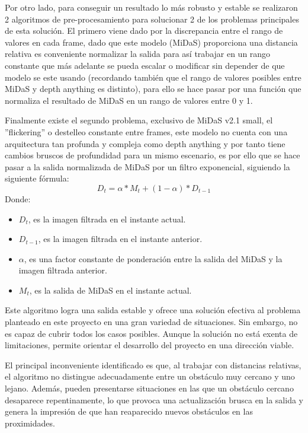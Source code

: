 \newpage

Por otro lado, para conseguir un resultado lo más robusto y estable se realizaron 2 algoritmos de pre-procesamiento para solucionar 2 de los problemas principales de esta solución. El primero viene dado por la discrepancia entre el rango de valores en cada frame, dado que este modelo (MiDaS) proporciona una distancia relativa es conveniente normalizar la salida para así trabajar en un rango constante que más adelante se pueda escalar o modificar sin depender de que modelo se este usando (recordando también que el rango de valores posibles entre MiDaS y depth anything es distinto), para ello se hace pasar por una función que normaliza el resultado de MiDaS en un rango de valores entre 0 y 1.

Finalmente existe el segundo problema, exclusivo de MiDaS v2.1 small, el ''flickering'' o destelleo constante entre frames, este modelo no cuenta con una arquitectura tan profunda y compleja como depth anything y por tanto tiene cambios bruscos de profundidad para un mismo escenario, es por ello que se hace pasar a la salida normalizada de MiDaS por un filtro exponencial, siguiendo la siguiente fórmula:
$$D_{t} = \alpha * M_{t} + (1 - \alpha) * D_{t-1}$$
\newpage
Donde:
\begin{itemize}
    \item $D_{t}$, es la imagen filtrada en el instante actual.
    \item $D_{t-1}$, es la imagen filtrada en el instante anterior.
    \item $\alpha$, es una factor constante de ponderación entre la salida del MiDaS y la imagen filtrada anterior.
    \item $M_{t}$, es la salida de MiDaS en el instante actual.
\end{itemize}

Este algoritmo logra una salida estable y ofrece una solución efectiva al problema planteado en este proyecto en una gran variedad de situaciones. Sin embargo, no es capaz de cubrir todos los casos posibles. Aunque la solución no está exenta de limitaciones, permite orientar el desarrollo del proyecto en una dirección viable.

El principal inconveniente identificado es que, al trabajar con distancias relativas, el algoritmo no distingue adecuadamente entre un obstáculo muy cercano y uno lejano. Además, pueden presentarse situaciones en las que un obstáculo cercano desaparece repentinamente, lo que provoca una actualización brusca en la salida y genera la impresión de que han reaparecido nuevos obstáculos en las proximidades.

